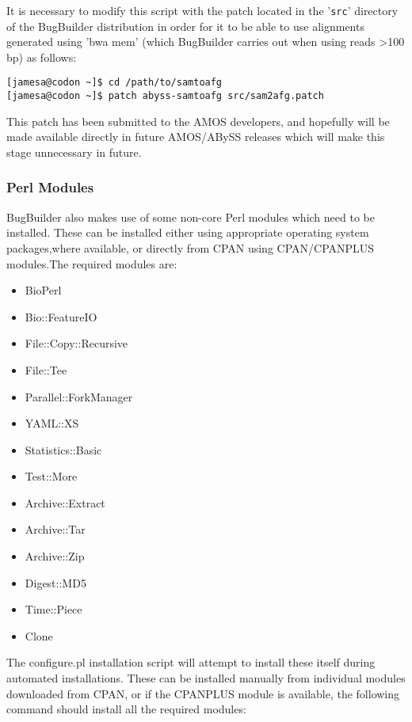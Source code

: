 \documentclass[a4paper,10pt]{article}
\begin{document}
It is necessary to modify this script with the patch located in the '{\tt src}'
directory of the BugBuilder distribution in order for it to be able to use
alignments generated using 'bwa mem' (which BugBuilder carries out when using
reads \textgreater 100 bp) as follows:

\begin{verbatim}
[jamesa@codon ~]$ cd /path/to/samtoafg 
[jamesa@codon ~]$ patch abyss-samtoafg src/sam2afg.patch
\end{verbatim}

This patch has been submitted to the AMOS developers, and hopefully will be made
available directly in future AMOS/ABySS releases which will make this stage
unnecessary in future.

\subsubsection{Perl Modules}

BugBuilder also makes use of some non-core Perl modules which need to be
installed. These can be installed either using appropriate operating system
packages,where available, or directly from CPAN using CPAN/CPANPLUS modules.The
required modules are:

\begin{itemize}
  \setlength\itemsep{0em}
  \item BioPerl 
  \item Bio::FeatureIO
  \item File::Copy::Recursive
  \item File::Tee
  \item Parallel::ForkManager
  \item YAML::XS
  \item Statistics::Basic
  \item Test::More
  \item Archive::Extract
  \item Archive::Tar
  \item Archive::Zip
  \item Digest::MD5
  \item Time::Piece
  \item Clone
\end{itemize}

The configure.pl installation script will attempt to install these itself
during automated installations. These can be installed manually from individual
modules downloaded from CPAN, or if the CPANPLUS module is available, the
following command  should install all the required modules:
\end{document}
